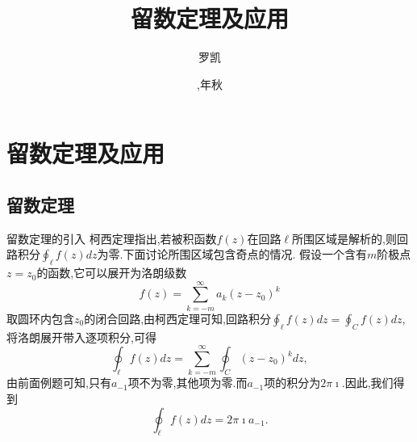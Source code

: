 \documentclass[fontset=windows, chinese, 10pt]{beamer}
\title{留数定理及应用}
\date{\zhdigits{2026},\zhganzhinian{2026}年秋}
\author{罗凯}
\institute{南京理工大学物理学院}
\begin{document}

  

  
  
  
  \begin{frame}
  \titlepage
  \end{frame}
  
  

\section{留数定理及应用}

\subsection{留数定理}
\label{subsec:residue_theorem}


\begin{frame}{留数定理的引入}
  \small
柯西定理指出,若被积函数$f(z)$在回路$\ell$所围区域是解析的,则回路积分$\oint_\ell f(z) dz$为零.下面讨论所围区域包含奇点的情况.
假设一个含有$m$阶极点$z=z_0$的函数,它可以展开为洛朗级数
$$
  f(z) = \sum_{k = -m} ^{\infty} a_k (z - z_0)^k  
$$
取圆环内包含$z_0$的闭合回路,由柯西定理可知,回路积分$\oint_\ell f(z) dz = \oint_C f(z) dz$, 将洛朗展开带入逐项积分,可得
$$
\oint_\ell f(z) dz = \sum_{k = -m} ^{\infty} \oint_C  (z - z_0)^k dz,
$$
由前面例题可知,只有$a_{-1}$项不为零,其他项为零.而$a_{-1}$项的积分为$2\pi\imath$.因此,我们得到
\begin{equation}
    \oint_\ell f(z) dz = 2\pi \imath a_{-1} .
\end{equation}
\end{frame}
\end{document}
